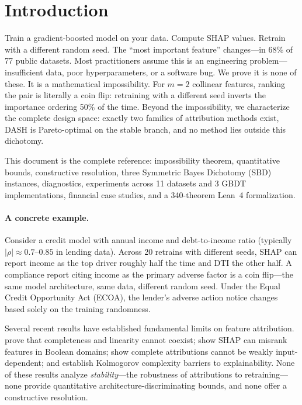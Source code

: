 \documentclass{article}
\begin{document}
\section{Introduction}
\label{sec:intro}

Train a gradient-boosted model on your data. Compute SHAP values. Retrain with a different random seed. The ``most important feature'' changes---in 68\% of 77 public datasets. Most practitioners assume this is an engineering problem---insufficient data, poor hyperparameters, or a software bug. We prove it is none of these. It is a mathematical impossibility. For $m{=}2$ collinear features, ranking the pair is literally a coin flip: retraining with a different seed inverts the importance ordering 50\% of the time.
Beyond the impossibility, we characterize the complete design space: exactly two families of attribution methods exist, DASH is Pareto-optimal on the stable branch, and no method lies outside this dichotomy.

This document is the complete reference: impossibility theorem, quantitative bounds, constructive resolution, three Symmetric Bayes Dichotomy (SBD) instances, diagnostics, experiments across 11 datasets and 3 GBDT implementations, financial case studies, and a 340-theorem Lean~4 formalization.

\paragraph{A concrete example.}
Consider a credit model with annual income and debt-to-income ratio
(typically $|\rho| \approx 0.7$--$0.85$ in lending data). Across 20 retrains with different seeds, SHAP
can report income as the top driver roughly half the time and DTI the other half.
A compliance report citing income as the primary adverse factor
is a coin flip---the same model architecture, same data, different
random seed. Under the Equal Credit Opportunity Act (ECOA), the lender's adverse action notice
changes based solely on the training randomness.

\begin{sloppypar}
Several recent results have established fundamental limits on feature attribution.
\citet{bilodeau2024impossibility} prove that completeness and linearity cannot coexist;
\citet{huang2024failings} show SHAP can misrank features in Boolean domains;
\citet{srinivas2019full} show complete attributions cannot be weakly input-dependent;
and \citet{rao2025limits} establish Kolmogorov complexity barriers to explainability.
None of these results analyze \emph{stability}---the robustness of attributions to
retraining---none provide quantitative architecture-discriminating bounds, and none
offer a constructive resolution.
\end{sloppypar}
\end{document}
